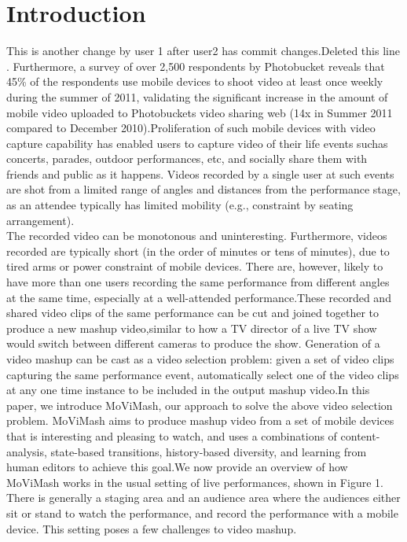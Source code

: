 \documentclass{sig-alternate}
\begin{document}
\section{Introduction}
This is another change by user 1 after user2 has commit changes.Deleted this line \cite{web:1}. Furthermore, a survey of over 2,500 respondents by Photobucket reveals that 45\% of the \cite{web:2} respondents use mobile devices to shoot video at least once weekly during the summer of 2011, validating the significant increase in the amount of mobile video uploaded to Photobucket\textquotesingle s video sharing web (14x in Summer 2011 compared to December 2010)\cite{web:3}.Proliferation of such mobile devices with video capture capability has enabled users to capture video of their life events suchas concerts, parades, outdoor performances, etc, and socially share them with friends and public as it happens. Videos recorded by a single user at such events are shot from a limited range of angles and distances from the performance stage, as an attendee typically has limited mobility (e.g., constraint by seating arrangement).\\
\qquad  The recorded video can be monotonous and uninteresting. Furthermore, videos recorded are typically short (in the order of minutes or tens of minutes), due to tired arms or power constraint of mobile devices. There are, however, likely to have more than one users
recording the same performance from different angles at the same time, especially at a well-attended performance.These recorded and shared video clips of the same performance
can be cut and joined together to produce a new mashup video,similar to how a TV director of a live TV show would switch between different cameras to produce the show. Generation of a video
mashup can be cast as a video selection problem: given a set of video clips capturing the same performance event, automatically select one of the video clips at any one time instance to be included in the output mashup video.In this paper, we introduce MoViMash, our approach to solve the above video selection problem. MoViMash aims to produce mashup video from a set of mobile devices that is interesting and pleasing to watch, and uses a combinations of content-analysis, state-based transitions, history-based diversity, and learning from
human editors to achieve this goal.We now provide an overview of how MoViMash works in the
usual setting of live performances, shown in Figure 1. There is generally a staging area and an audience area where the audiences either sit or stand to watch the performance, and record the performance with a mobile device. This setting poses a few challenges to video mashup.
\end{document}
